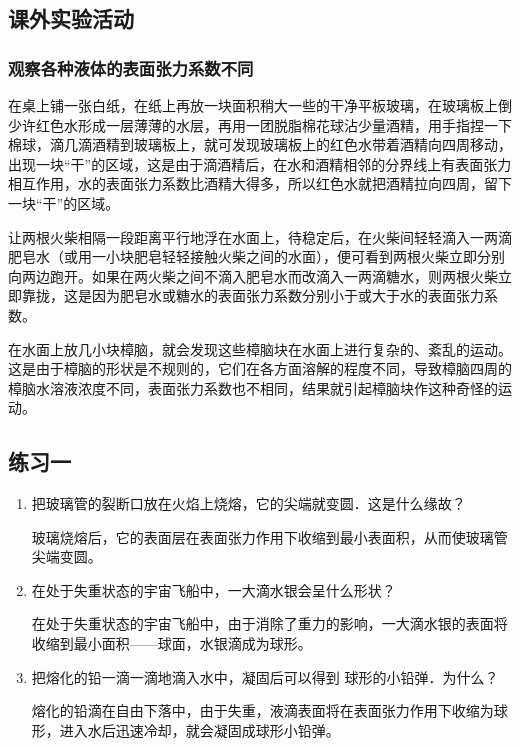 \subsection{课外实验活动}
\subsubsection{观察各种液体的表面张力系数不同}

在桌上铺一张白纸，在纸上再放一块面积稍大一些的干净平板玻璃，在玻璃板上倒少许红色水形成一层薄薄的水层，再用一团脱脂棉花球沾少量酒精，用手指捏一下棉球，滴几滴酒精到玻璃板上，就可发现玻璃板上的红色水带着酒精向四周移动，出现一块“干”的区域，这是由于滴酒精后，在水和酒精相邻的分界线上有表面张力相互作用，水的表面张力系数比酒精大得多，所以红色水就把酒精拉向四周，留下一块“干”的区域。

让两根火柴相隔一段距离平行地浮在水面上，待稳定后，在火柴间轻轻滴入一两滴肥皂水（或用一小块肥皂轻轻接触火柴之间的水面），便可看到两根火柴立即分别向两边跑开。如果在两火柴之间不滴入肥皂水而改滴入一两滴糖水，则两根火柴立即靠拢，这是因为肥皂水或糖水的表面张力系数分别小于或大于水的表面张力系数。

在水面上放几小块樟脑，就会发现这些樟脑块在水面上进行复杂的、紊乱的运动。这是由于樟脑的形状是不规则的，它们在各方面溶解的程度不同，导致樟脑四周的樟脑水溶液浓度不同，表面张力系数也不相同，结果就引起樟脑块作这种奇怪的运动。

\subsection{练习一}
\begin{enumerate}
    \item 把玻璃管的裂断口放在火焰上烧熔，它的尖端就变圆．这是什么缘故？

\begin{solution}
    玻璃烧熔后，它的表面层在表面张力作用下收缩到最小表面积，从而使玻璃管尖端变圆。    
\end{solution}
\item 在处于失重状态的宇宙飞船中，一大滴水银会呈什么形状？

\begin{solution}
    在处于失重状态的宇宙飞船中，由于消除了重力的影响，一大滴水银的表面将收缩到最小面积——球面，水银滴成为球形。    
\end{solution}
\item 把熔化的铅一滴一滴地滴入水中，凝固后可以得到
球形的小铅弹．为什么？

\begin{solution}
    熔化的铅滴在自由下落中，由于失重，液滴表面将在表面张力作用下收缩为球形，进入水后迅速冷却，就会凝固成球形小铅弹。
\end{solution}
\end{enumerate}

